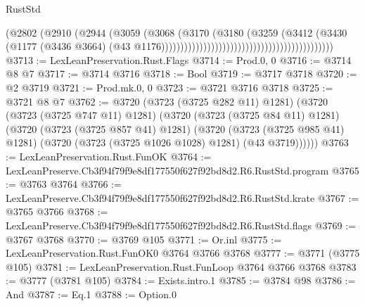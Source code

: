 \begin{lexlean}{RustStd}
\begin{coremodule}
                                                                      (@2802
                                                                        (@2910
                                                                          (@2944
                                                                            (@3059
                                                                              (@3068
                                                                                (@3170
                                                                                  (@3180
                                                                                    (@3259
                                                                                      (@3412
                                                                                        (@3430
                                                                                          (@1177
                                                                                            (@3436
                                                                                              @3664)
                                                                                            (@43
                                                                                              @1176)))))))))))))))))))))))))))))))))))))))))))))
@3713 := LexLeanPreservation.Rust.Flags
@3714 := Prod.{0, 0}
@3716 := @3714 @8 @7
@3717 := @3714 @3716
@3718 := Bool
@3719 := @3717 @3718
@3720 := @2 @3719
@3721 := Prod.mk.{0, 0}
@3723 := @3721 @3716 @3718
@3725 := @3721 @8 @7
@3762 := @3720
    (@3723 (@3725 @282 @11) @1281)
    (@3720
      (@3723 (@3725 @747 @11) @1281)
      (@3720
        (@3723 (@3725 @84 @11) @1281)
        (@3720
          (@3723 (@3725 @857 @41) @1281)
          (@3720
            (@3723 (@3725 @985 @41) @1281)
            (@3720 (@3723 (@3725 @1026 @1028) @1281) (@43 @3719))))))
@3763 := LexLeanPreservation.Rust.FunOK
@3764 := LexLeanPreserve.Cb3f94f79f9e8df177550f627f92bd8d2.R6.RustStd.program
@3765 := @3763 @3764
@3766 := LexLeanPreserve.Cb3f94f79f9e8df177550f627f92bd8d2.R6.RustStd.krate
@3767 := @3765 @3766
@3768 := LexLeanPreserve.Cb3f94f79f9e8df177550f627f92bd8d2.R6.RustStd.flags
@3769 := @3767 @3768
@3770 := @3769 @105
@3771 := Or.inl
@3775 := LexLeanPreservation.Rust.FunOK0 @3764 @3766 @3768
@3777 := @3771 (@3775 @105)
@3781 := LexLeanPreservation.Rust.FunLoop @3764 @3766 @3768
@3783 := @3777 (@3781 @105)
@3784 := Exists.intro.{1}
@3785 := @3784 @98
@3786 := And
@3787 := Eq.{1}
@3788 := Option.{0}

\end{coremodule}
\end{lexlean}
